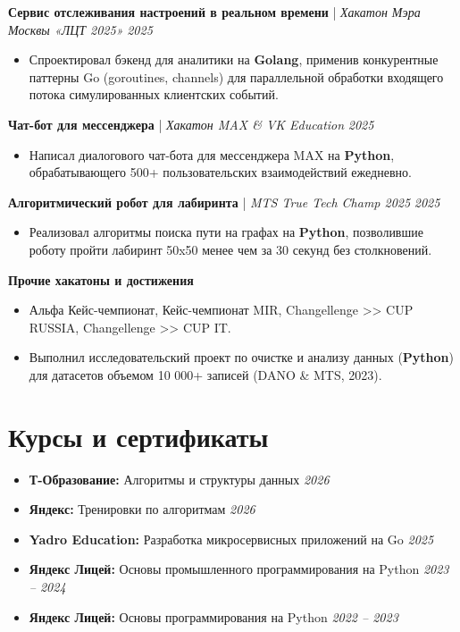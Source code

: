 \documentclass[11pt,a4paper]{article}
\begin{document}
\vspace{4pt}
\textbf{Сервис отслеживания настроений в реальном времени} | \textit{Хакатон Мэра Москвы «ЛЦТ 2025»} \hfill \textit{2025}
\begin{itemize}[leftmargin=0.5cm, itemsep=0pt, topsep=2pt]
    \item Спроектировал бэкенд для аналитики на \textbf{Golang}, применив конкурентные паттерны Go (goroutines, channels) для параллельной обработки входящего потока симулированных клиентских событий.
\end{itemize}

\vspace{4pt}
\textbf{Чат-бот для мессенджера} | \textit{Хакатон MAX \& VK Education} \hfill \textit{2025}
\begin{itemize}[leftmargin=0.5cm, itemsep=0pt, topsep=2pt]
    \item Написал диалогового чат-бота для мессенджера MAX на \textbf{Python}, обрабатывающего 500+ пользовательских взаимодействий ежедневно.
\end{itemize}

\vspace{4pt}
\textbf{Алгоритмический робот для лабиринта} | \textit{MTS True Tech Champ 2025} \hfill \textit{2025}
\begin{itemize}[leftmargin=0.5cm, itemsep=0pt, topsep=2pt]
    \item Реализовал алгоритмы поиска пути на графах на \textbf{Python}, позволившие роботу пройти лабиринт 50x50 менее чем за 30 секунд без столкновений.
\end{itemize}

\vspace{4pt}
\textbf{Прочие хакатоны и достижения}
\begin{itemize}[leftmargin=0.5cm, itemsep=0pt, topsep=2pt]
    \item Альфа Кейс-чемпионат, Кейс-чемпионат MIR, Changellenge >> CUP RUSSIA, Changellenge >> CUP IT.
    \item Выполнил исследовательский проект по очистке и анализу данных (\textbf{Python}) для датасетов объемом 10 000+ записей (DANO \& MTS, 2023).
\end{itemize}

\section{Курсы и сертификаты}
\begin{itemize}[leftmargin=0.5cm, itemsep=2pt, topsep=2pt]
    \item \textbf{Т-Образование:} Алгоритмы и структуры данных \hfill \textit{2026}
    \item \textbf{Яндекс:} Тренировки по алгоритмам \hfill \textit{2026}
    \item \textbf{Yadro Education:} Разработка микросервисных приложений на Go \hfill \textit{2025}
    \item \textbf{Яндекс Лицей:} Основы промышленного программирования на Python \hfill \textit{2023 -- 2024}
    \item \textbf{Яндекс Лицей:} Основы программирования на Python \hfill \textit{2022 -- 2023}
\end{itemize}
\end{document}
